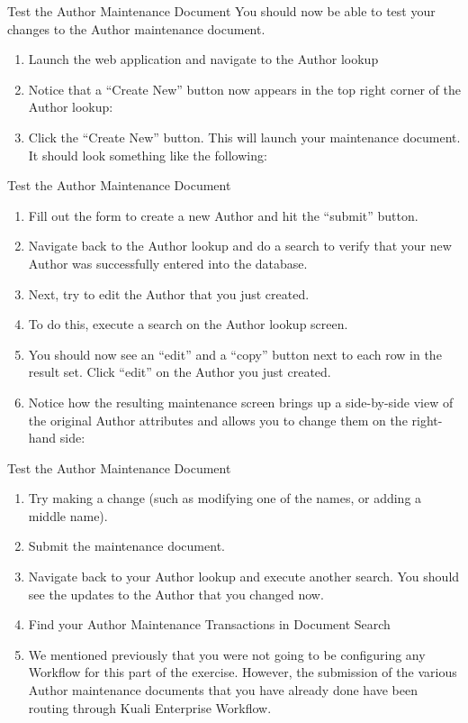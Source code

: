 \documentclass[xcolor=dvipsnames,14pt,professionalfonts]{beamer}
\begin{document}
\begin{frame}{Test the Author Maintenance Document}
  You should now be able to test your changes to the Author maintenance document.
  \begin{enumerate}
    \item Launch the web application and navigate to the Author lookup
    \item Notice that a “Create New” button now appears in the top right corner of the Author lookup:
    \item Click the “Create New” button.  This will launch your maintenance document.  It should look something like the following:
  \end{enumerate}
\end{frame}

\begin{frame}{Test the Author Maintenance Document}
  \begin{enumerate}
  \item Fill out the form to create a new Author and hit the “submit” button.
  \item Navigate back to the Author lookup and do a search to verify that your new Author was successfully entered into the database.
  \item Next, try to edit the Author that you just created.
  \item To do this, execute a search on the Author lookup screen.
  \item You should now see an “edit” and a “copy” button next to each row in the result set.  Click “edit” on the Author you just created.
  \item Notice how the resulting maintenance screen brings up a side-by-side view of the original Author attributes and allows you to change them on the right-hand side:
  \end{enumerate}
\end{frame}

\begin{frame}{Test the Author Maintenance Document}
  \begin{enumerate}
  \item Try making a change (such as modifying one of the names, or adding a middle name).
  \item Submit the maintenance document.
  \item Navigate back to your Author lookup and execute another search.  You should see the updates to the Author that you changed now.
  \item Find your Author Maintenance Transactions in Document Search
    \item We mentioned previously that you were not going to be configuring any Workflow for this part of the exercise.  However, the submission of the various Author maintenance documents that you have already done have been routing through Kuali Enterprise Workflow.
  \end{enumerate}
\end{frame}
\end{document}
